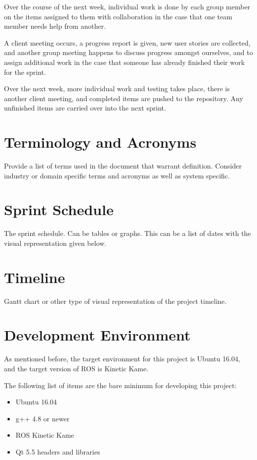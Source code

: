 Over the course of the next week, individual work is done by each group member on the items assigned to them with collaboration in the case that one team member needs help from another.

A client meeting occurs, a progress report is given, new user stories are collected, and another group meeting happens to discuss progress amongst ourselves, and to assign additional work in the case that someone has already finished their work for the sprint.

Over the next week, more individual work and testing takes place, there is another client meeting, and completed items are pushed to the repository. Any unfinished items are carried over into the next sprint.

\section{Terminology and Acronyms}
Provide a list of terms used in the document that warrant definition.  Consider 
industry or domain specific terms and acronyms as well as system specific. 

\section{Sprint Schedule}
The sprint schedule.  Can be tables or graphs.   This can be a list of dates with the visual 
representation given below.

\section{Timeline}
Gantt chart or other type of visual representation of the project timeline.

\section{Development Environment}
As mentioned before, the target environment for this project is Ubuntu 16.04, and the target version of ROS is Kinetic Kame.

The following list of items are the bare minimum for developing this project:
\begin{itemize}
	\item Ubuntu 16.04
	\item g++ 4.8 or newer
	\item ROS Kinetic Kame
	\item Qt 5.5 headers and libraries
\end{itemize}

